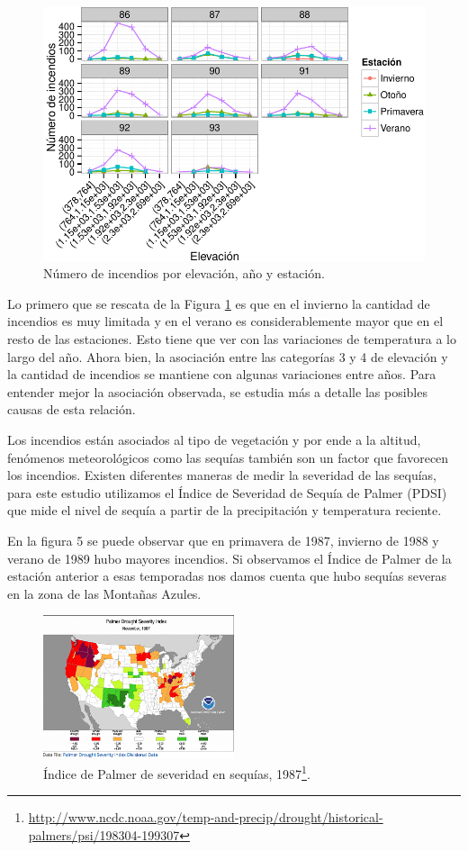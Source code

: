 \documentclass[12,]{article}
\let\rmarkdownfootnote\footnote%
\def\footnote{\protect\rmarkdownfootnote}
\begin{document}
\begin{figure}[H]
\centering
\includegraphics{tarea2_files/figure-latex/unnamed-chunk-5-1.pdf}
\caption{Número de incendios por elevación, año y estación.}
\label{estelev}
\end{figure}

Lo primero que se rescata de la Figura \ref{estelev} es que en el
invierno la cantidad de incendios es muy limitada y en el verano es
considerablemente mayor que en el resto de las estaciones. Esto tiene
que ver con las variaciones de temperatura a lo largo del año. Ahora
bien, la asociación entre las categorías 3 y 4 de elevación y la
cantidad de incendios se mantiene con algunas variaciones entre años.
Para entender mejor la asociación observada, se estudia más a detalle
las posibles causas de esta relación.

Los incendios están asociados al tipo de vegetación y por ende a la
altitud, fenómenos meteorológicos como las sequías también son un factor
que favorecen los incendios. Existen diferentes maneras de medir la
severidad de las sequías, para este estudio utilizamos el Índice de
Severidad de Sequía de Palmer (PDSI) que mide el nivel de sequía a
partir de la precipitación y temperatura reciente.

En la figura 5 se puede observar que en primavera de 1987, invierno de
1988 y verano de 1989 hubo mayores incendios. Si observamos el Índice de
Palmer de la estación anterior a esas temporadas nos damos cuenta que
hubo sequías severas en la zona de las Montañas Azules.

\begin{figure}[H]
\centering
\includegraphics[width=0.5\textwidth]{imagenes/IP87.png}
\caption{Índice de Palmer de severidad en sequías, 1987\footnote{\url{http://www.ncdc.noaa.gov/temp-and-precip/drought/historical-palmers/psi/198304-199307}}.}

\end{figure}
\end{document}
